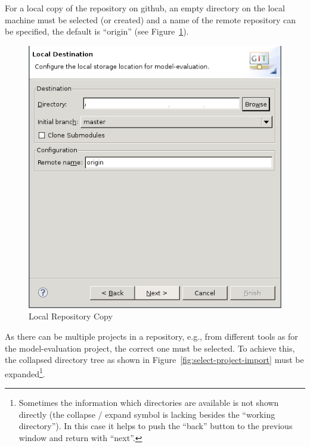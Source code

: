 \documentclass[10pt,a4paper]{article}
\newcommand{\skalierung}{.6}
\begin{document}
For a local copy of the repository on github, an empty directory on the local
machine must be selected (or created) and a name of the remote repository can be
specified, the default is ``origin'' (see Figure~\ref{fig:local-copy}).

\begin{figure}[H]
  \centering
  \includegraphics[width=\skalierung\textwidth]{project_import_step5}
  \caption{Local Repository Copy}
  \label{fig:local-copy}
\end{figure}

As there can be multiple projects in a repository, e.g., from different tools as
for the model-evaluation project, the correct one must be selected. To achieve
this, the collapsed directory tree as shown in
Figure~\ref{fig:select-project-import} must be expanded\footnote{Sometimes the
  information which directories are available is not shown directly (the
  collapse / expand symbol is lacking besides the ``working directory''). In
  this case it helps to push the ``back'' button to the previous window and
  return with ``next''.}.
\end{document}
